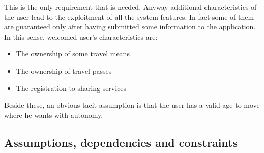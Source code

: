 This is the only requirement that is needed. Anyway additional characteristics of the user lead to the exploitment of all the system features. In fact some of them are guaranteed only after having submitted some information to the application.
In this sense, welcomed user's characteristics are:

\begin{itemize}
\item The ownership of some travel means
\item The ownership of travel passes
\item The registration to sharing services
\end{itemize}

Beside these, an obvious tacit assumption is that the user has a valid age to move where he wants with autonomy.


\subsection{ Assumptions, dependencies and constraints}

